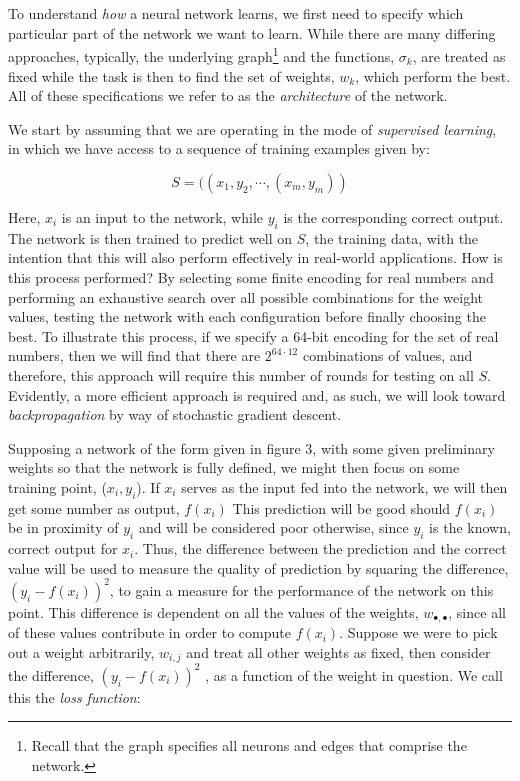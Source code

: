 \documentclass[11pt]{article}
\begin{document}
\section{}

To understand \textit{how} a neural network learns, we first need to specify which particular part of the network we want to learn. While there are many differing approaches, typically,  the underlying graph\footnote{Recall that the graph specifies all neurons and edges that comprise the network.} and the functions, $\sigma_{k}$, are treated as fixed while the task is then to find the set of weights, $w_{k}$, which perform the best. All of these specifications we refer to as the \textit{architecture} of the network.

We start by assuming that we are operating in the mode of \textit{supervised learning}, in which we have access to a sequence of training examples given by:

\begin{equation}S = ((x_{1}, y_{2}, \cdots , (x_{m}, y_{m}))\nonumber\end{equation}

Here, $x_{i}$ is an input to the network, while $y_{i}$ is the corresponding correct output. The network is then trained to predict well on $S$, the training data, with the intention that this will also perform effectively in real-world applications. How is this process performed? By selecting some finite encoding for real numbers and performing an exhaustive search over all possible combinations for the weight values, testing the network with each configuration before finally choosing the best. To illustrate this process, if we specify a 64-bit encoding for the set of real numbers, then we will find that there are $2^{64 \cdot 12}$ combinations of values, and therefore, this approach will require this number of rounds for testing on all $S$. Evidently, a more efficient approach is required and, as such, we will look toward \textit{backpropagation} by way of stochastic gradient descent.

Supposing a network of the form given in figure 3, with some given preliminary weights so that the network is fully defined, we might then focus on some training point, ($x_{i}, y_{i}$). If $x_{i}$ serves as the input fed into the network, we will then get some number as output, $f(x_{i})$ This prediction will be good should $f(x_{i})$ be in proximity of $y_{i}$ and will be considered poor otherwise, since $y_{i}$ is the known, correct output for $x_{i}$. Thus, the difference between the prediction and the correct value will be used to measure the quality of prediction by squaring the difference, $(y_{i}-f(x_{i}))^2$, to gain a measure for the performance of the network on this point. This difference is dependent on all the values of the weights, $w_{\bullet, \bullet}$, since all of these values contribute in order to compute $f(x_{i})$. Suppose we were to pick out a weight arbitrarily, $w_{i, j}$ and treat all other weights as fixed, then consider the difference, $(y_{i}-f(x_{i}))^2$ , as a function of the weight in question. We call this the \textit{loss function}:
\end{document}
